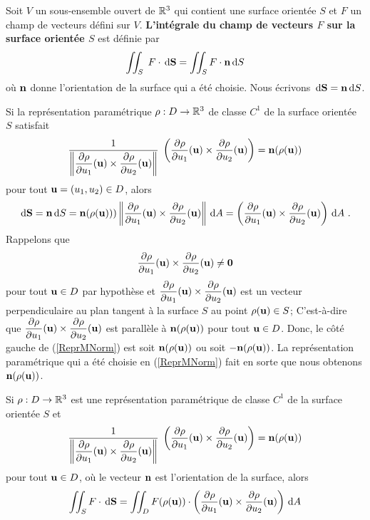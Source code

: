 {\begin{defn}
Soit $V$ un sous-ensemble ouvert de $\mathbb{R}^3$ qui contient une surface
orientée $S$ et $F$ un champ de vecteurs défini sur $V$.
{\bfseries L'intégrale du champ de vecteurs $F$ sur la surface
orientée $S$} est définie par
\[
\iint_S\; F \cdot \,\mathrm{d}\mathbf{S} = \iint_S F \cdot \mathbf{n} \,\mathrm{d}S
\]
où $\mathbf{n}$ donne l'orientation de la surface qui a été choisie.
Nous écrivons $\,\mathrm{d}\mathbf{S} = \mathbf{n} \,\mathrm{d}S$.
\end{defn}

Si la représentation paramétrique $\rho:D\rightarrow \mathbb{R}^3$
de classe $C^1$ de la surface orientée $S$ satisfait
\begin{equation}\label{ReprMNorm}
\frac{1}{\displaystyle \left\| \frac{\partial \rho}{\partial u_1}(\mathbf{u}) \times
\frac{\partial \rho}{\partial u_2}(\mathbf{u})\right\|} \;
\left( \frac{\partial \rho}{\partial u_1}(\mathbf{u}) \times \frac{\partial \rho}{\partial u_2}(\mathbf{u}) \right)
= \mathbf{n}(\rho(\mathbf{u}))
\end{equation}
pour tout $\mathbf{u} = (u_1,u_2) \in D$, alors
\[
\,\mathrm{d}\mathbf{S} = \mathbf{n} \,\mathrm{d}S 
= \mathbf{n}(\rho(\mathbf{u}))) 
\left\| \frac{\partial \rho}{\partial u_1}(\mathbf{u}) \times
\frac{\partial \rho}{\partial u_2}(\mathbf{u})\right\| \,\mathrm{d}A
= \left( \frac{\partial \rho}{\partial u_1}(\mathbf{u}) \times
\frac{\partial \rho}{\partial u_2}(\mathbf{u})\right) \,\mathrm{d}A \ .
\]
Rappelons que
\[
\frac{\partial \rho}{\partial u_1}(\mathbf{u}) \times \frac{\partial \rho}{\partial u_2}(\mathbf{u}) \neq \mathbf{0}
\]
pour tout $\mathbf{u} \in D$ par hypothèse et
$\displaystyle \frac{\partial \rho}{\partial u_1}(\mathbf{u}) \times \frac{\partial \rho}{\partial u_2}(\mathbf{u})$
est un vecteur perpendiculaire au plan tangent à la surface
$S$ au point $\rho(\mathbf{u}) \in S$;
C'est-à-dire que 
$\displaystyle \frac{\partial \rho}{\partial u_1}(\mathbf{u}) \times \frac{\partial \rho}{\partial u_2}(\mathbf{u})$
est parallèle à $\mathbf{n}(\rho(\mathbf{u}))$ pour tout
$\mathbf{u} \in D$.  Donc, le côté gauche de (\ref{ReprMNorm}) est soit
$\mathbf{n}(\rho(\mathbf{u}))$ ou soit $-\mathbf{n}(\rho(\mathbf{u}))$.
La représentation paramétrique qui a été choisie en (\ref{ReprMNorm})
fait en sorte que nous obtenons $\mathbf{n}(\rho(\mathbf{u}))$.

\begin{prop}
Si $\rho:D\rightarrow \mathbb{R}^3$ est une représentation paramétrique de classe
$C^1$ de la surface orientée $S$ et
\[
\frac{1}{\displaystyle \left\| \frac{\partial \rho}{\partial u_1}(\mathbf{u}) \times
\frac{\partial \rho}{\partial u_2}(\mathbf{u})\right\|} \;
\left( \frac{\partial \rho}{\partial u_1}(\mathbf{u}) \times \frac{\partial \rho}{\partial u_2}(\mathbf{u}) \right)
= \mathbf{n}(\rho(\mathbf{u}))
\]
pour tout $\mathbf{u} \in D$, où le vecteur $\mathbf{n}$ est l'orientation de
la surface, alors
\begin{equation} \label{formula}
\iint_S F \cdot \,\mathrm{d}\mathbf{S}
= \iint_D F(\rho(\mathbf{u})) \cdot \left(\frac{\partial \rho}{\partial u_1}(\mathbf{u})
\times \frac{\partial \rho}{\partial u_2}(\mathbf{u})\right) \,\mathrm{d}A
\end{equation}
\end{prop}

}
